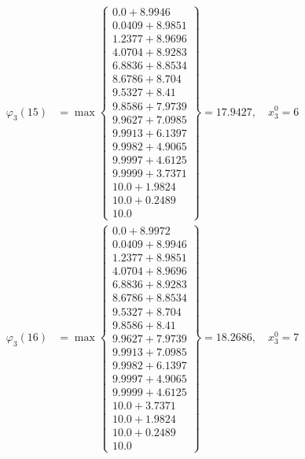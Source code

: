 \documentclass{article}
\begin{document}
\begin{align*}
  
\varphi_{3}(15) &= \max \left\{ \begin{array}{c}
0.0 + 8.9946 \\
 0.0409 + 8.9851 \\
 1.2377 + 8.9696 \\
 4.0704 + 8.9283 \\
 6.8836 + 8.8534 \\
 8.6786 + 8.704 \\
 9.5327 + 8.41 \\
 9.8586 + 7.9739 \\
 9.9627 + 7.0985 \\
 9.9913 + 6.1397 \\
 9.9982 + 4.9065 \\
 9.9997 + 4.6125 \\
 9.9999 + 3.7371 \\
 10.0 + 1.9824 \\
 10.0 + 0.2489 \\
 10.0
\end{array} \right\}=17.9427,\quad x_{3}^0=6\\
  
  
  
  
\varphi_{3}(16) &= \max \left\{ \begin{array}{c}
0.0 + 8.9972 \\
 0.0409 + 8.9946 \\
 1.2377 + 8.9851 \\
 4.0704 + 8.9696 \\
 6.8836 + 8.9283 \\
 8.6786 + 8.8534 \\
 9.5327 + 8.704 \\
 9.8586 + 8.41 \\
 9.9627 + 7.9739 \\
 9.9913 + 7.0985 \\
 9.9982 + 6.1397 \\
 9.9997 + 4.9065 \\
 9.9999 + 4.6125 \\
 10.0 + 3.7371 \\
 10.0 + 1.9824 \\
 10.0 + 0.2489 \\
 10.0
\end{array} \right\}=18.2686,\quad x_{3}^0=7\\
  
  
  

\end{align*}
\end{document}
